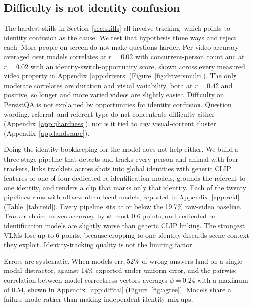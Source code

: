 \documentclass{article}
\newcommand{\bench}{PersistQA}
\begin{document}
\subsection{Difficulty is not identity confusion}
\label{sec:notidentity}
The hardest skills in Section~\ref{sec:skills} all involve tracking, which points to identity confusion as the cause. We test that hypothesis three ways and reject each. More people on screen do not make questions harder. Per-video accuracy averaged over models correlates at $r=0.02$ with concurrent-person count and at $r=0.02$ with an identity-switch-opportunity score, shown across every measured video property in Appendix~\ref{app:drivers} (Figure~\ref{fig:driversmulti}). The only moderate correlates are duration and visual variability, both at $r=0.42$ and positive, so longer and more varied videos are slightly easier. Difficulty on \bench{} is not explained by opportunities for identity confusion. Question wording, referral, and referent type do not concentrate difficulty either (Appendix~\ref{app:qhardness}), nor is it tied to any visual-content cluster (Appendix~\ref{app:landscape}).

Doing the identity bookkeeping for the model does not help either. We build a three-stage pipeline that detects and tracks every person and animal with four trackers, links tracklets across shots into global identities with generic CLIP features or one of four dedicated re-identification models, grounds the referent to one identity, and renders a clip that marks only that identity. Each of the twenty pipelines runs with all seventeen local models, reported in Appendix~\ref{app:reid} (Table~\ref{tab:reid}). Every pipeline sits at or below the 19.7\% raw-video baseline. Tracker choice moves accuracy by at most 0.6 points, and dedicated re-identification models are slightly worse than generic CLIP linking. The strongest VLMs lose up to 6 points, because cropping to one identity discards scene context they exploit. Identity-tracking quality is not the limiting factor.

Errors are systematic. When models err, 52\% of wrong answers land on a single modal distractor, against 14\% expected under uniform error, and the pairwise correlation between model correctness vectors averages $\phi=0.24$ with a maximum of 0.54, shown in Appendix~\ref{app:diffcal} (Figure~\ref{fig:agree}). Models share a failure mode rather than making independent identity mix-ups.
\end{document}
